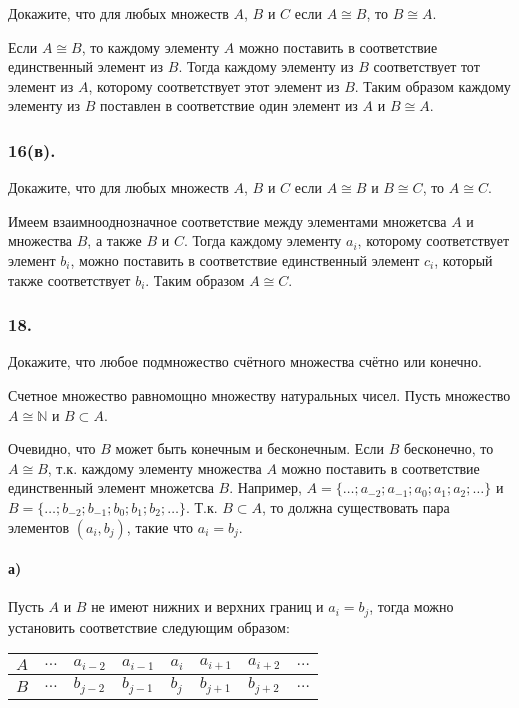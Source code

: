 \documentclass{book}
\begin{document}
Докажите, что для любых множеств $A$, $B$ и $C$ если $A \cong B$, то $B \cong A$.

Если $A \cong B$, то каждому элементу $A$ можно поставить в соответствие единственный элемент из $B$. Тогда каждому элементу из $B$ соответствует тот элемент из $A$, которому соответствует этот элемент из $B$. Таким образом каждому элементу из $B$ поставлен в соответствие один элемент из $A$ и $B \cong A$.

\subsubsection{16(в).}

Докажите, что для любых множеств $A$, $B$ и $C$ если $A \cong B$ и $B \cong C$, то $A \cong C$.

Имеем взаимнооднозначное соответствие между элементами множетсва $A$ и множества $B$, а также $B$ и $C$. Тогда каждому элементу $a_i$, которому соответствует элемент $b_i$, можно поставить в соответствие единственный элемент $c_i$, который также соответствует $b_i$. Таким образом $A \cong C$.

\subsubsection{18.}
Докажите, что любое подмножество счётного множества счётно или конечно.

Счетное множество равномощно множеству натуральных чисел. Пусть множество $A \cong \mathbb{N}$ и $B \subset A$.

Очевидно, что $B$ может быть конечным и бесконечным. Если $B$ бесконечно, то $A \cong B$, т.к. каждому элементу множества $A$ можно поставить в соответствие единственный элемент множетсва $B$. Например, $A = \{\dots; a_{-2}; a_{-1}; a_0; a_1; a_2; \dots\}$ и $B = \{\dots; b_{-2}; b_{-1}; b_0; b_1; b_2; \dots\}$. Т.к. $B \subset A$, то должна существовать пара элементов $(a_i, b_j)$, такие что $a_i = b_j$.

\paragraph{а)} Пусть $A$ и $B$ не имеют нижних и верхних границ и $a_i = b_j$, тогда можно установить соответствие следующим образом:

\begin{tabularx}{0.6\textwidth} { 
    | >{\centering\arraybackslash}X
    | >{\centering\arraybackslash}X
    | >{\centering\arraybackslash}X
    | >{\centering\arraybackslash}X
    | >{\centering\arraybackslash}X
    | >{\centering\arraybackslash}X
    | >{\centering\arraybackslash}X 
  | >{\centering\arraybackslash}X | }
 \hline  $A$ & $\dots$ & $a_{i-2}$ & $a_{i-1}$ & $a_i$ & $a_{i+1}$ & $a_{i+2}$ & $\dots$ \\
 \hline  $B$ & $\dots$ & $b_{j-2}$ & $b_{j-1}$ & $b_j$ & $b_{j+1}$ & $b_{j+2}$ & $\dots$ \\
 \hline
\end{tabularx}
\end{document}
